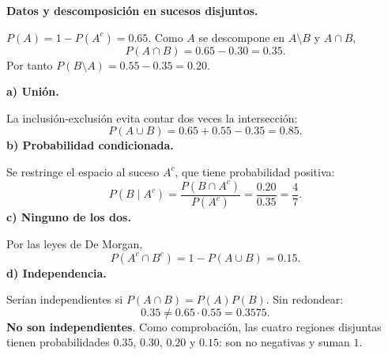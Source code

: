 \textbf{Datos y descomposición en sucesos disjuntos.}\par\nopagebreak[4]
$P(A)=1-P(A^c)=0.65$. Como $A$ se descompone en $A\setminus B$ y $A\cap B$,
\[
P(A\cap B)=0.65-0.30=0.35.
\]
Por tanto $P(B\setminus A)=0.55-0.35=0.20$.

\textbf{a) Unión.}\par\nopagebreak[4]
La inclusión-exclusión evita contar dos veces la intersección:
\[
\boxed{P(A\cup B)=0.65+0.55-0.35=0.85.}
\]
\textbf{b) Probabilidad condicionada.}\par\nopagebreak[4]
Se restringe el espacio al suceso $A^c$, que tiene probabilidad positiva:
\[
\boxed{P(B\mid A^c)=\frac{P(B\cap A^c)}{P(A^c)}=\frac{0.20}{0.35}=\frac47.}
\]
\textbf{c) Ninguno de los dos.}\par\nopagebreak[4]
Por las leyes de De Morgan,
\[
\boxed{P(A^c\cap B^c)=1-P(A\cup B)=0.15.}
\]
\textbf{d) Independencia.}\par\nopagebreak[4]
Serían independientes si $P(A\cap B)=P(A)P(B)$. Sin redondear:
\[
0.35\ne0.65\cdot0.55=0.3575.
\]
\textbf{No son independientes}. Como comprobación, las cuatro regiones disjuntas tienen probabilidades $0.35$, $0.30$, $0.20$ y $0.15$: son no negativas y suman $1$.
